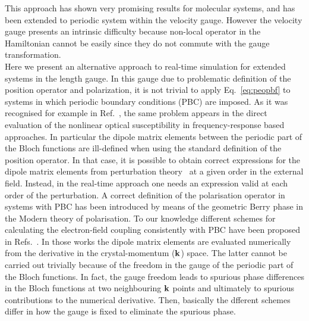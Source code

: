 This approach has shown very promising results for molecular systems, and has been extended to periodic system within the velocity gauge.\cite{tancogne2020octopus,noda2019salmon} However the velocity gauge presents an intrinsic difficulty because non-local operator in the Hamiltonian cannot be easily since they do not commute with the gauge transformation.\cite{tokman}\\
Here we present an alternative approach to real-time simulation for extended systems in the length gauge.
In this gauge due to problematic definition of the position operator and polarization, it is not trivial to apply Eq.~\eqref{eq:peopbf} to systems in which periodic boundary conditions (PBC) are imposed. As it was recognised for example in Ref.~, the same problem appears in the direct evaluation of the nonlinear optical susceptibility in frequency-response based approaches. In particular the dipole matrix elements between the periodic part of the Bloch functions are ill-defined when using the standard definition of the  position operator. In that case, it is possible to obtain correct expressions for the dipole matrix elements from perturbation theory~\cite{PhysRevB.52.14636,PhysRevB.48.11705,PhysRevB.82.235201,korbel2015optical} at a given order in the external field. Instead, in the real-time approach one needs an expression valid at each order of the perturbation.
A correct definition of the polarisation operator in systems with PBC has been introduced by means of the geometric Berry phase in the Modern theory of polarisation.\cite{RevModPhys.66.899} 
To our knowledge different schemes for calculating the electron-field coupling consistently with PBC have been proposed in Refs.~\cite{springborg, PhysRevB.76.035213, souza_prb, korbel2015optical}. In those works the dipole matrix elements are evaluated numerically from the derivative in the crystal-momentum (${\bf k}$) space. The latter cannot be carried out trivially because of the freedom in the gauge of the periodic part of the Bloch functions. In fact, the gauge freedom leads to spurious phase differences in the Bloch functions at two neighbouring ${\bf k}$ points and ultimately to spurious contributions to the numerical derivative.
Then, basically the dfferent schemes~\cite{springborg, PhysRevB.76.035213, souza_prb, korbel2015optical} differ in how the gauge is fixed to eliminate the spurious phase.

